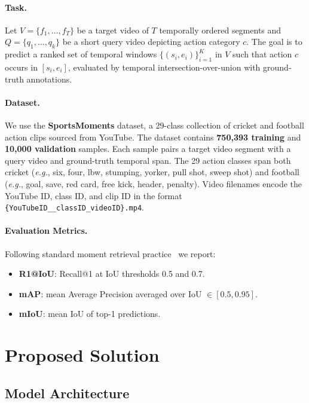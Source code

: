 \documentclass[10pt,twocolumn]{article}
\begin{document}
\paragraph{Task.}
Let $V = \{f_1, \ldots, f_T\}$ be a target video of $T$ temporally ordered
segments and $Q = \{q_1, \ldots, q_k\}$ be a short query video depicting action
category $c$. The goal is to predict a ranked set of temporal windows
$\{(s_i, e_i)\}_{i=1}^K$ in $V$ such that action $c$ occurs in
$[s_i, e_i]$, evaluated by temporal intersection-over-union with ground-truth
annotations.

\paragraph{Dataset.}
We use the \textbf{SportsMoments} dataset, a 29-class collection of cricket and
football action clips sourced from YouTube. The dataset contains
\textbf{750,393 training} and \textbf{10,000 validation} samples. Each sample
pairs a target video segment with a query video and ground-truth temporal span.
The 29 action classes span both cricket (\textit{e.g.}, six, four, lbw, stumping,
yorker, pull shot, sweep shot) and football (\textit{e.g.}, goal, save, red
card, free kick, header, penalty). Video filenames encode the YouTube ID,
class ID, and clip ID in the format \texttt{\{YouTubeID\_\_classID\_videoID\}.mp4}.

\paragraph{Evaluation Metrics.}
Following standard moment retrieval practice~\cite{lei2021qvhighlights} we report:
\begin{itemize}[leftmargin=*,noitemsep]
  \item \textbf{R1@IoU}: Recall@1 at IoU thresholds 0.5 and 0.7.
  \item \textbf{mAP}: mean Average Precision averaged over IoU $\in [0.5, 0.95]$.
  \item \textbf{mIoU}: mean IoU of top-1 predictions.
\end{itemize}

\section{Proposed Solution}

\subsection{Model Architecture}
\end{document}
